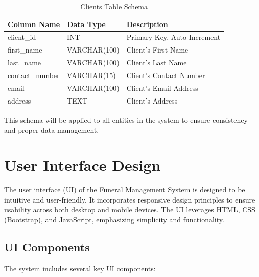 \documentclass[a4paper,12pt]{report}
\begin{document}
\begin{table}[ht]
\centering
\begin{tabular}{|l|l|l|}
\hline
\textbf{Column Name} & \textbf{Data Type} & \textbf{Description} \\ \hline
client\_id & INT & Primary Key, Auto Increment \\ \hline
first\_name & VARCHAR(100) & Client’s First Name \\ \hline
last\_name & VARCHAR(100) & Client’s Last Name \\ \hline
contact\_number & VARCHAR(15) & Client’s Contact Number \\ \hline
email & VARCHAR(100) & Client’s Email Address \\ \hline
address & TEXT & Client’s Address \\ \hline
\end{tabular}
\caption{Clients Table Schema}
\label{tab:clients_schema}
\end{table}

This schema will be applied to all entities in the system to ensure consistency and proper data management.

\section{User Interface Design}
The user interface (UI) of the Funeral Management System is designed to be intuitive and user-friendly. It incorporates responsive design principles to ensure usability across both desktop and mobile devices. The UI leverages HTML, CSS (Bootstrap), and JavaScript, emphasizing simplicity and functionality.

\subsection{UI Components}
The system includes several key UI components:
\end{document}
